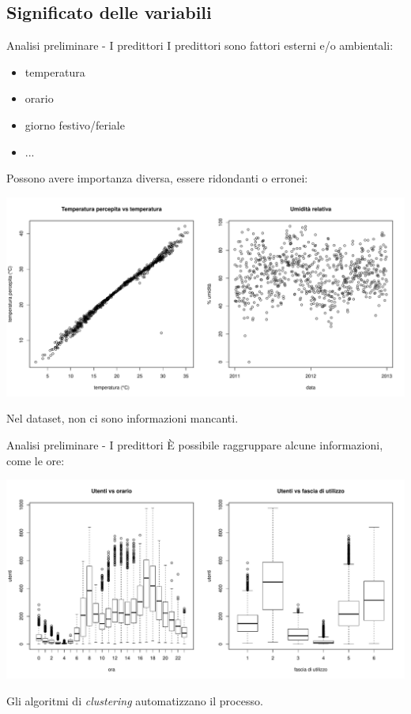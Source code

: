 \documentclass{beamer}
\begin{document}
\subsection{Significato delle variabili}
\begin{frame}{Analisi preliminare - I predittori}
I predittori sono fattori esterni e/o ambientali:
\begin{itemize}
  \item temperatura
  \item orario
  \item giorno festivo/feriale
  \item ...
\end{itemize}

Possono avere importanza diversa, essere ridondanti o erronei:
\begin{center}
  \includegraphics[height=0.3\textheight]{images/temperature-humidity.pdf}
\end{center}
Nel dataset, non ci sono informazioni mancanti.
\end{frame}


\begin{frame}{Analisi preliminare - I predittori}
\`E possibile raggruppare alcune informazioni, come le ore:
\begin{center}
  \includegraphics[height=0.5\textheight]{images/hour-timeslot.pdf}
\end{center}
Gli algoritmi di \emph{clustering} automatizzano il processo.
\end{frame}
\end{document}
